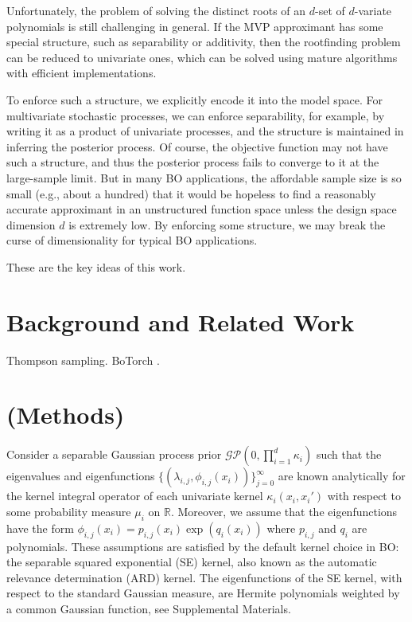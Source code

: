 \documentclass{article}
\begin{document}
Unfortunately, the problem of solving the distinct roots of an $d$-set
of $d$-variate polynomials is still challenging in general. If the MVP
approximant has some special structure, such as separability or
additivity, then the rootfinding problem can be reduced to univariate
ones, which can be solved using mature algorithms with efficient
implementations.

To enforce such a structure, we explicitly encode it into the model
space. For multivariate stochastic processes, we can enforce
separability, for example, by writing it as a product of univariate
processes, and the structure is maintained in inferring the posterior
process. Of course, the objective function may not have such a
structure, and thus the posterior process fails to converge to it at the
large-sample limit. But in many BO applications, the affordable sample
size is so small (e.g., about a hundred) that it would be hopeless to
find a reasonably accurate approximant in an unstructured function space
unless the design space dimension $d$ is extremely low. By enforcing
some structure, we may break the curse of dimensionality for typical BO
applications.

These are the key ideas of this work.

\section{Background and Related Work}

Thompson sampling.
BoTorch \cite{Balandat2020}.

\section{(Methods)}

Consider a separable Gaussian process prior
$\mathcal{GP}(0, \prod_{i=1}^d \kappa_i)$ such that the eigenvalues
and eigenfunctions $\{(\lambda_{i,j}, \phi_{i,j}(x_i))\}_{j=0}^\infty$
are known analytically for the kernel integral operator of each
univariate kernel $\kappa_i(x_i, x_i')$ with respect to some
probability measure $\mu_i$ on $\mathbb{R}$. Moreover, we assume
that the eigenfunctions have the form
$\phi_{i,j}(x_i) = p_{i,j}(x_i) \exp(q_i(x_i))$ where $p_{i,j}$ and
$q_i$ are polynomials. These assumptions are satisfied by the default
kernel choice in BO: the separable squared exponential (SE) kernel, also
known as the automatic relevance determination (ARD) kernel. The
eigenfunctions of the SE kernel, with respect to the standard Gaussian
measure, are Hermite polynomials weighted by a common Gaussian function,
see Supplemental Materials.
\end{document}
